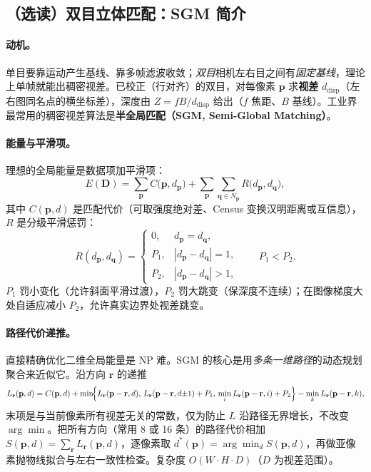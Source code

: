 \subsection{（选读）双目立体匹配：SGM 简介}
\label{sec:dense-sgm}

\paragraph{动机。}
单目要靠运动产生基线、靠多帧滤波收敛；\emph{双目}相机左右目之间有\emph{固定基线}，理论上单帧就能出稠密视差。已校正（行对齐）的双目，对每像素 $\mathbf{p}$ 求\textbf{视差} $d_{\mathrm{disp}}$（左右图同名点的横坐标差），深度由 $Z=fB/d_{\mathrm{disp}}$ 给出（$f$ 焦距、$B$ 基线）。工业界最常用的稠密视差算法是\textbf{半全局匹配（SGM, Semi-Global Matching）}\cite{hirschmuller2008sgm}。

\paragraph{能量与平滑项。}
理想的全局能量是数据项加平滑项：
\begin{equation}
  E(\mathbf{D})=\sum_{\mathbf{p}}C\!\bigl(\mathbf{p},d_{\mathbf{p}}\bigr)
   +\sum_{\mathbf{p}}\sum_{\mathbf{q}\in N_{\mathbf{p}}}R\!\bigl(d_{\mathbf{p}},d_{\mathbf{q}}\bigr),
  \label{eq:dense-sgm-energy}
\end{equation}
其中 $C(\mathbf{p},d)$ 是匹配代价（可取强度绝对差、Census 变换汉明距离或互信息），$R$ 是分级平滑惩罚：
\begin{equation}
  R(d_{\mathbf{p}},d_{\mathbf{q}})=\begin{cases}0,&d_{\mathbf{p}}=d_{\mathbf{q}},\\ P_1,&|d_{\mathbf{p}}-d_{\mathbf{q}}|=1,\\ P_2,&|d_{\mathbf{p}}-d_{\mathbf{q}}|>1,\end{cases}
  \qquad P_1<P_2.
  \label{eq:dense-sgm-smooth}
\end{equation}
$P_1$ 罚小变化（允许斜面平滑过渡），$P_2$ 罚大跳变（保深度不连续）；在图像梯度大处自适应减小 $P_2$，允许真实边界处视差跳变。

\paragraph{路径代价递推。}
直接精确优化二维全局能量是 NP 难。SGM 的核心是用\emph{多条一维路径}的动态规划聚合来近似它。沿方向 $\mathbf{r}$ 的递推
\begin{equation}
  L_{\mathbf{r}}(\mathbf{p},d)=C(\mathbf{p},d)+\min\!\Bigl\{
   L_{\mathbf{r}}(\mathbf{p}-\mathbf{r},d),\,
   L_{\mathbf{r}}(\mathbf{p}-\mathbf{r},d{\pm}1)+P_1,\,
   \min_i L_{\mathbf{r}}(\mathbf{p}-\mathbf{r},i)+P_2\Bigr\}
   -\min_k L_{\mathbf{r}}(\mathbf{p}-\mathbf{r},k),
  \label{eq:dense-sgm-path}
\end{equation}
末项是与当前像素所有视差无关的常数，仅为防止 $L$ 沿路径无界增长，不改变 $\arg\min$。把所有方向（常用 8 或 16 条）的路径代价相加 $S(\mathbf{p},d)=\sum_{\mathbf{r}}L_{\mathbf{r}}(\mathbf{p},d)$，逐像素取 $d^*(\mathbf{p})=\arg\min_d S(\mathbf{p},d)$，再做亚像素抛物线拟合与左右一致性检查。复杂度 $O(W\cdot H\cdot D)$（$D$ 为视差范围）。


